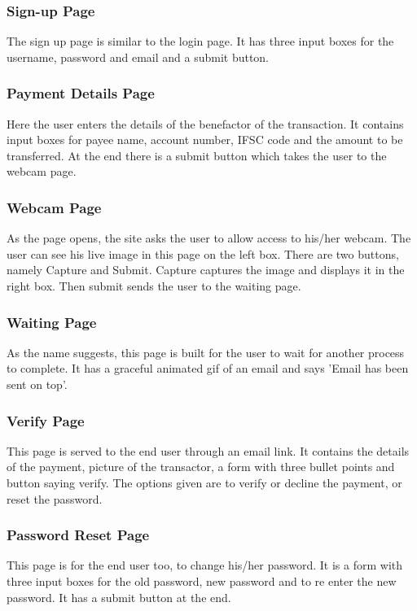 \documentclass[12pt, oneside, a4paper]{article}
\begin{document}
\subsubsection{Sign-up Page}
The sign up page is similar to the login page. It has three input boxes for the username, password and email and a submit button.

\subsubsection{Payment Details Page}
Here the user enters the details of the benefactor of the transaction. It contains input boxes for payee name, account number, IFSC code and the amount to be transferred. At the end there is a submit button which takes the user to the webcam page.

\subsubsection{Webcam Page}
As the page opens, the site asks the user to allow access to his/her webcam. The user can see his live image in this page on the left box. There are two buttons, namely Capture and Submit. Capture captures the image and displays it in the right box. Then submit sends the user to the waiting page.

\subsubsection{Waiting Page}
As the name suggests, this page is built for the user to wait for another process to complete. It has a graceful animated gif of an email and says 'Email has been sent on top'.

\subsubsection{Verify Page}
This page is served to the end user through an email link. It contains the details of the payment, picture of the transactor, a form with three bullet points and button saying verify. The options given are to verify or decline the payment, or reset the password.

\subsubsection{Password Reset Page}
This page is for the end user too, to change his/her  password. It is a form with three input boxes for the old password, new password and to re enter the new password. It has a submit button at the end.
\end{document}
